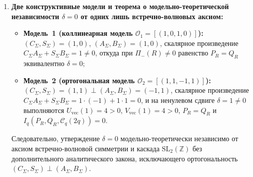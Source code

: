 \begin{theorem}
\begin{enumerate}[label=\textbf{(\arabic*)},leftmargin=*]
  после прохождения пары $(U_{\mathrm{vec}}(\delta), V_{\mathrm{vec}}(\delta))$ через произвольный $M$-этажный каскад $R \in \mathrm{List}\,\mathbb{Z}$ выходные амплитуды $P_R = \operatorname{minkowskiCascadeP}(R, U_{\mathrm{vec}}(\delta), V_{\mathrm{vec}}(\delta))$ и $Q_R = \operatorname{minkowskiCascadeQ}(R, U_{\mathrm{vec}}(\delta), V_{\mathrm{vec}}(\delta))$ удовлетворяют
  \begin{equation}
    \label{eq:math-cascade-diff-trichotomy}
    P_R - Q_R \;\equiv\; 4\,\Pi_-(R)\,\bigl(C_\Sigma A_\Sigma + S_\Sigma B_\Sigma\bigr)\,\delta,
  \end{equation}
  а при $q > 0$, $P_R > 0$, $Q_R > 0$ обращение в нуль интенсивности деструктивной интерференции $I_q(P_R, Q_R, \mathcal{C}_q(\Delta\varphi)) = q(P_R - Q_R)^2 + 2 P_R Q_R(q + \mathcal{C}_q(\Delta\varphi))$ эквивалентно тройной дихотомии:
  \begin{equation}
    \label{eq:math-counterwave-zero-iff-trichotomy}
    I_q\bigl(P_R,\, Q_R,\, \mathcal{C}_q(\Delta\varphi)\bigr) = 0
    \;\Longleftrightarrow\;
    \Bigl(\Pi_-(R) = 0 \;\lor\; C_\Sigma A_\Sigma + S_\Sigma B_\Sigma = 0 \;\lor\; \delta = 0\Bigr)
    \;\land\; \operatorname{pauliPhaseDistNat}(q, \Delta\varphi) = 0.
  \end{equation}
\item \textbf{Две конструктивные модели и теорема о модельно-теоретической независимости $\delta = 0$ от одних лишь встречно-волновых аксиом:}
  \begin{itemize}[noitemsep]
  \item \textbf{Модель~1 (коллинеарная модель $\mathcal{O}_1 = [(1, 0, 1, 0)]$):} $(C_\Sigma, S_\Sigma) = (1, 0)$, $(A_\Sigma, B_\Sigma) = (1, 0)$, скалярное произведение $C_\Sigma A_\Sigma + S_\Sigma B_\Sigma = 1 \ne 0$, откуда при $\Pi_-(R) \ne 0$ равенство $P_R = Q_R$ эквивалентно $\delta = 0$;
  \item \textbf{Модель~2 (ортогональная модель $\mathcal{O}_2 = [(1, 1, -1, 1)]$):} $(C_\Sigma, S_\Sigma) = (1, 1) \perp (A_\Sigma, B_\Sigma) = (-1, 1)$, скалярное произведение $C_\Sigma A_\Sigma + S_\Sigma B_\Sigma = 1\cdot(-1) + 1\cdot 1 = 0$, и на ненулевом сдвиге $\delta = 1 \ne 0$ выполняются $U_{\mathrm{vec}}(1) = 4 > 0$, $V_{\mathrm{vec}}(1) = 4 > 0$, $P_R = Q_R$ и $I_q(P_R, Q_R, \mathcal{C}_q(2q)) = 0$.
  \end{itemize}
  Следовательно, утверждение $\delta = 0$ модельно-теоретически независимо от аксиом встречно-волновой симметрии и каскада $\mathrm{SL}_2(\mathbb{Z})$ без дополнительного аналитического закона, исключающего ортогональность $(C_\Sigma, S_\Sigma) \perp (A_\Sigma, B_\Sigma)$.
\end{enumerate}
\end{theorem}

